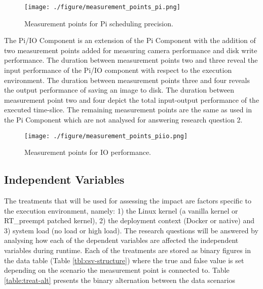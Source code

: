 \begin{figure}[ht]
\centering
     \texttt{[image: ./figure/measurement\_points\_pi.png]}
      \caption{Measurement points for Pi scheduling precision.}
       \label{pi_measure}
\end{figure}

The Pi/IO Component is an extension of the Pi Component with the addition of two measurement points added for measuring camera performance and disk write performance. The duration between measurement points two and three reveal the input performance of the Pi/IO component with respect to the execution environment. The duration between measurement points three and four reveals the output performance of saving an image to disk. The duration between measurement point two and four depict the total input-output performance of the executed time-slice. The remaining measurement points are the same as used in the Pi Component which are not analysed for answering research question 2.



\begin{figure}[ht]
\centering
     \texttt{[image: ./figure/measurement\_points\_piio.png]}
      \caption{Measurement points for IO performance.}
       \label{piio_measure}
\end{figure}


\subsection{Independent Variables} \label{section:independent}
The treatments that will be used for assessing the impact are factors specific to the execution environment, namely: 1) the Linux kernel (a vanilla kernel or RT\_preempt patched kernel), 2) the deployment context (Docker or native) and 3) system load (no load or high load). The research questions will be answered by analysing how each of the dependent variables are affected the independent variables during runtime. Each of the treatments are stored as binary figures in the data table (Table \ref{tbl:csv-structure}) where the true and false value is set depending on the scenario the measurement point is connected to. Table \ref{table:treat-alt} presents the binary alternation between the data scenarios

